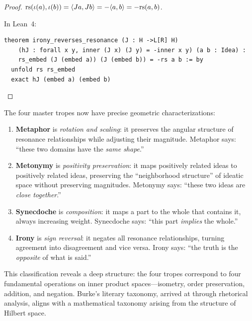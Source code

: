 \begin{proof}
$\mathrm{rs}(\iota(a), \iota(b)) = \langle Ja, Jb \rangle = -\langle a, b \rangle
= -\mathrm{rs}(a, b)$.

In Lean~4:
\begin{lstlisting}
theorem irony_reverses_resonance (J : H ->L[R] H)
    (hJ : forall x y, inner (J x) (J y) = -inner x y) (a b : Idea) :
    rs_embed (J (embed a)) (J (embed b)) = -rs a b := by
  unfold rs rs_embed
  exact hJ (embed a) (embed b)
\end{lstlisting}
\end{proof}

\begin{interpretation}
\label{interp:burke-tropes}
The four master tropes now have precise geometric characterizations:

\begin{enumerate}
\item \textbf{Metaphor} is \emph{rotation and scaling}: it preserves the
angular structure of resonance relationships while adjusting their magnitude.
Metaphor says: ``these two domains have the \emph{same shape}.''

\item \textbf{Metonymy} is \emph{positivity preservation}: it maps positively
related ideas to positively related ideas, preserving the ``neighborhood
structure'' of ideatic space without preserving magnitudes.  Metonymy says:
``these two ideas are \emph{close together}.''

\item \textbf{Synecdoche} is \emph{composition}: it maps a part to the whole
that contains it, always increasing weight.  Synecdoche says: ``this part
\emph{implies} the whole.''

\item \textbf{Irony} is \emph{sign reversal}: it negates all resonance
relationships, turning agreement into disagreement and vice versa.  Irony
says: ``the truth is the \emph{opposite} of what is said.''
\end{enumerate}

This classification reveals a deep structure: the four tropes correspond to
four fundamental operations on inner product spaces---isometry, order
preservation, addition, and negation.  Burke's literary taxonomy, arrived at
through rhetorical analysis, aligns with a mathematical taxonomy arising from
the structure of Hilbert space.
\end{interpretation}

